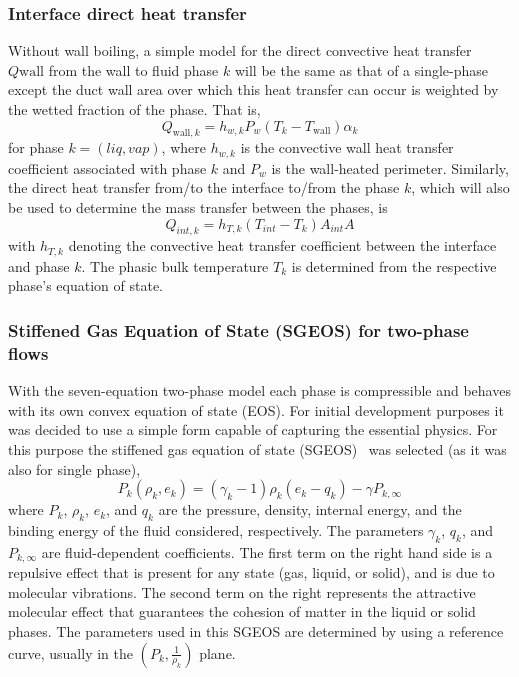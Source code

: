 \subsubsection{Interface direct heat transfer}
Without wall boiling, a simple model for the direct convective heat transfer $Q{ \text{wall}}$
from the wall to fluid phase $k$ will be the same as that of a single-phase
except the duct wall area over which this heat transfer can occur is weighted
by the wetted fraction of the phase.  That is,
\begin{equation}
  Q_{ \text{wall}, k } = h_{w,k} P_w \left(T_k  - T_{ \text{wall} } \right) \alpha_k
\end{equation}
for phase $k=(liq, vap)$, where $h_{w,k}$ is the convective wall heat transfer
coefficient associated with phase $k$ and $P_w$ is the wall-heated perimeter. Similarly, the direct heat
transfer from/to the interface to/from the phase $k$, which will also
be used to determine the mass transfer between the phases, is
\begin{equation}
  Q_{int,  k} = h_{T,  k}  \left( T_{int} - T_k \right)  A_{int}  A
\end{equation}
with $h_{T,  k}$ denoting the convective heat transfer coefficient
between the interface and phase $k$. The phasic bulk
temperature $T_k$ is determined from the respective phase's equation of
state.
\subsubsection{Stiffened Gas Equation of State (SGEOS) for two-phase flows} \label{sec:SGEOS}
With the seven-equation two-phase model each phase is compressible and
behaves with its own convex equation of state (EOS).  For initial
development purposes it was decided to use a simple form capable of
capturing the essential physics.  For this purpose the stiffened
gas equation of state (SGEOS)~\cite{SGEOS} was selected (as
it was also for single phase),
\begin{equation}
  \label{E-R:96}
  P_k(\rho_k,e_k) = (\gamma_k -1) \rho_k (e_k - q_k) - \gamma P_{k,\infty}
\end{equation}
where $P_k$, $\rho_k$, $e_k$, and $q_k$ are the pressure, density,
internal energy, and the binding energy of the fluid considered, respectively.  The
parameters $\gamma_k$, $q_k$, and $P_{k,\infty}$ are fluid-dependent coefficients. The first term on the right hand side
is a repulsive effect that is present for any state (gas, liquid, or
solid), and is due to molecular vibrations.  The second term on the
right represents the attractive molecular effect that guarantees the
cohesion of matter in the liquid or solid phases.  The parameters used
in this SGEOS are determined by using a reference curve, usually in
the $\left(P_k, \frac{1}{\rho_k}\right)$ plane.

